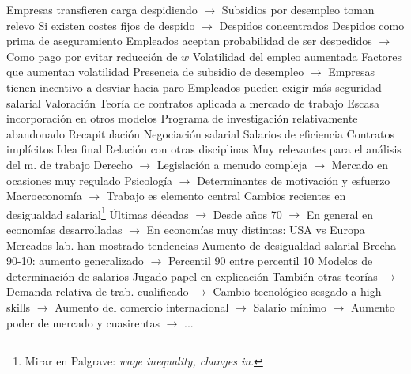 \documentclass{nuevotema}
\begin{document}
\begin{esquemal}
				\4 Empresas transfieren carga despidiendo
				\4[] $\to$ Subsidios por desempleo toman relevo
				\4[] Si existen costes fijos de despido
				\4[] $\to$ Despidos concentrados
				\4 Despidos como prima de aseguramiento
				\4[] Empleados aceptan probabilidad de ser despedidos
				\4[] $\to$ Como pago por evitar reducción de $w$
			\3 Volatilidad del empleo aumentada
				\4 Factores que aumentan volatilidad
				\4[] Presencia de subsidio de desempleo
				\4[] $\to$ Empresas tienen incentivo a desviar hacia paro
				\4[] Empleados pueden exigir más seguridad salarial
		\2 Valoración
			\3 Teoría de contratos aplicada a mercado de trabajo
			\3 Escasa incorporación en otros modelos
			\3 Programa de investigación relativamente abandonado
	\1[] 
		\2 Recapitulación
			\3 Negociación salarial
			\3 Salarios de eficiencia
			\3 Contratos implícitos
		\2 Idea final
			\3 Relación con otras disciplinas
				\4 Muy relevantes para el análisis del m. de trabajo
				\4[] Derecho
				\4[] $\to$ Legislación a menudo compleja
				\4[] $\to$ Mercado en ocasiones muy regulado
				\4[] Psicología
				\4[] $\to$ Determinantes de motivación y esfuerzo
				\4[] Macroeconomía
				\4[] $\to$ Trabajo es elemento central
			\3 Cambios recientes en desigualdad salarial\footnote{Mirar en Palgrave: \textit{wage inequality, changes in}.}
				\4 Últimas décadas
				\4[] $\to$ Desde años 70
				\4[] $\to$ En general en economías desarrolladas
				\4[] $\to$ En economías muy distintas: USA vs Europa
				\4[] Mercados lab. han mostrado tendencias
				\4 Aumento de desigualdad salarial
				\4[] Brecha 90-10: aumento generalizado
				\4[] $\to$ Percentil 90 entre percentil 10
				\4 Modelos de determinación de salarios
				\4[] Jugado papel en explicación
				\4[] También otras teorías
				\4[] $\to$ Demanda relativa de trab. cualificado
				\4[] $\to$ Cambio tecnológico sesgado a high skills
				\4[] $\to$ Aumento del comercio internacional
				\4[] $\to$ Salario mínimo
				\4[] $\to$ Aumento poder de mercado y cuasirentas
				\4[] $\to$ ...
\end{esquemal}
\end{document}
